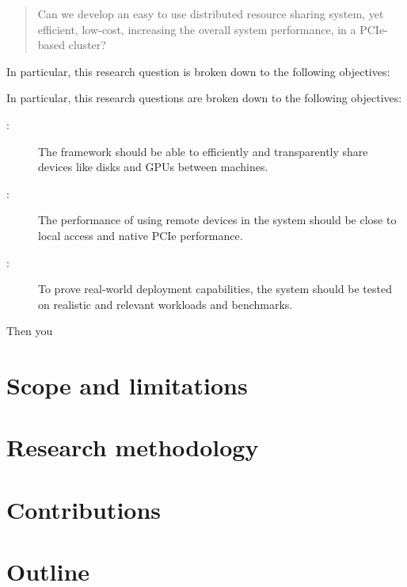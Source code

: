 \begin{quote}
    Can we develop an easy to use distributed resource sharing system, yet efficient, low-cost, increasing the overall system performance, in a PCIe-based cluster?
\end{quote}


In particular, this research question is broken down to the following objectives:




In particular, this research questions are broken down to the following objectives:
\begin{description}
	\item[:] The framework should be able to efficiently and transparently share devices like disks and GPUs between machines.
	\item[:] The performance of using remote devices in the system should be close to local access and native PCIe performance.
	\item[:] To prove real-world deployment capabilities, the system should be tested on realistic and relevant workloads and benchmarks.
	
\end{description}

Then you 

%	

\section{Scope and limitations}

\section{Research methodology}

\section{Contributions}

\section{Outline}
